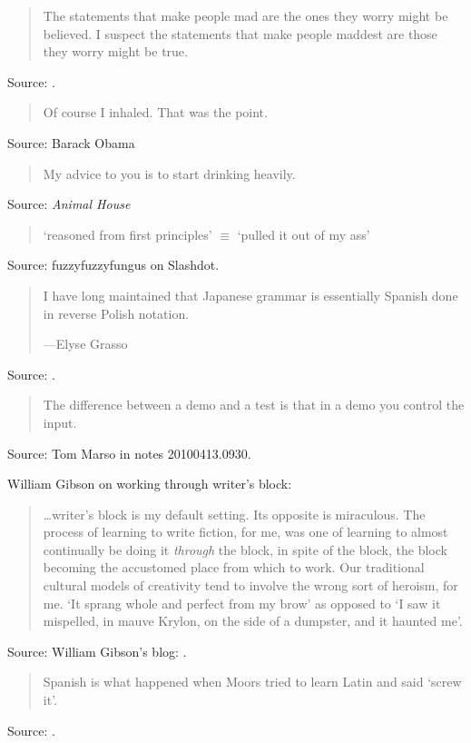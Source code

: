 \documentclass[a4paper]{article}
\begin{document}
\begin{quote}
	The statements that make people mad are the ones they worry
	might be believed. I suspect the statements that make people
	maddest are those they worry might be true.
\end{quote}
Source: \citet{Graham2004}.
\medskip

\begin{quote}
	Of course I inhaled.  That was the point.
\end{quote}
Source: Barack Obama
\medskip

\begin{quote}
	My advice to you is to start drinking heavily.
\end{quote}
Source: \emph{Animal House}
\medskip

\begin{quote}
	`reasoned from first principles' $\equiv$ `pulled it out of my ass'
\end{quote}
Source: fuzzyfuzzyfungus on Slashdot.
\medskip

\begin{quote}
	I have long maintained that Japanese grammar is essentially
	Spanish done in reverse Polish notation.

	---Elyse Grasso
\end{quote}
Source: \citet{Cowan2010}.
\medskip

\begin{quote}
	The difference between a demo and a test is that in a demo you
	control the input.
\end{quote}
Source: Tom Marso in notes 20100413.0930.
\medskip

William Gibson on working through writer's block:
\begin{quote}
	\ldots writer's block is my default setting. Its opposite is
	miraculous. The process of learning to write fiction, for me,
	was one of learning to almost continually be doing it \emph{through}
	the block, in spite of the block, the block becoming the
	accustomed place from which to work. Our traditional cultural
	models of creativity tend to involve the wrong sort of heroism,
	for me.  `It sprang whole and perfect from my brow' as opposed to
	`I saw it mispelled, in mauve Krylon, on the side of a dumpster,
	and it haunted me'.
\end{quote}
Source: William Gibson's blog: \citet{Gibson2010a}.
\medskip

\begin{quote}
	Spanish is what happened when Moors tried to learn Latin and
	said `screw it'.
\end{quote}
Source: \citet{Cowan2010}.
\medskip
\end{document}
